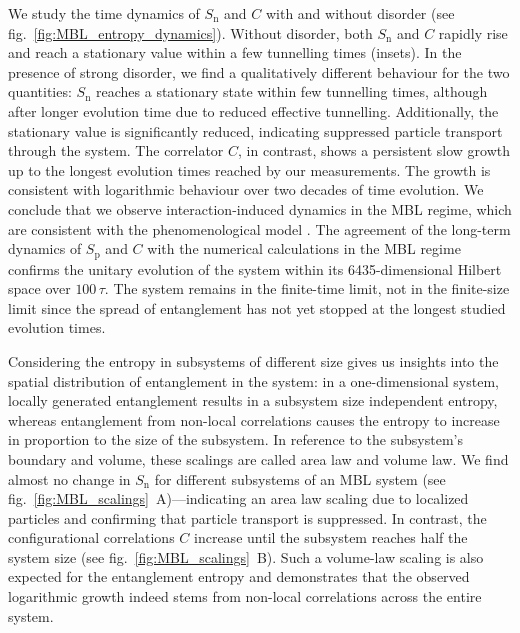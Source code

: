 We study the time dynamics of $S_\text{n}$ and $C$ with and without disorder (see fig.~\ref{fig:MBL_entropy_dynamics}). Without disorder, both $S_\text{n}$ and $C$ rapidly rise and reach a stationary value within a few tunnelling times (insets). In the presence of strong disorder, we find a qualitatively different behaviour for the two quantities: $S_\text{n}$ reaches a stationary state within few tunnelling times, although after longer evolution time due to reduced effective tunnelling. Additionally, the stationary value is significantly reduced, indicating suppressed particle transport through the system. The correlator $C$, in contrast, shows a persistent slow growth up to the longest evolution times reached by our measurements. The growth is consistent with logarithmic behaviour over two decades of time evolution. We conclude that we observe interaction-induced dynamics in the MBL regime, which are consistent with the phenomenological model \cite{Serbyn2013, Serbyn2013b, Huse2014}. The agreement of the long-term dynamics of $S_\text{p}$ and $C$ with the numerical calculations in the MBL regime confirms the unitary evolution of the system within its 6435-dimensional Hilbert space over $100\,\tau$. The system remains in the finite-time limit, not in the finite-size limit since the spread of entanglement has not yet stopped at the longest studied evolution times. 

Considering the entropy in subsystems of different size gives us insights into the spatial distribution of entanglement in the system: in a one-dimensional system, locally generated entanglement results in a subsystem size independent entropy, whereas entanglement from non-local correlations causes the entropy to increase in proportion to the size of the subsystem. In reference to the subsystem's boundary and volume, these scalings are called area law and volume law. We find almost no change in $S_\text{n}$ for different subsystems of an MBL system (see fig.~\ref{fig:MBL_scalings}~A)---indicating an area law scaling due to localized particles and confirming that particle transport is suppressed. In contrast, the configurational correlations $C$ increase until the subsystem reaches half the system size (see fig.~\ref{fig:MBL_scalings}~B). Such a volume-law scaling is also expected for the entanglement entropy and demonstrates that the observed logarithmic growth indeed stems from non-local correlations across the entire system.

